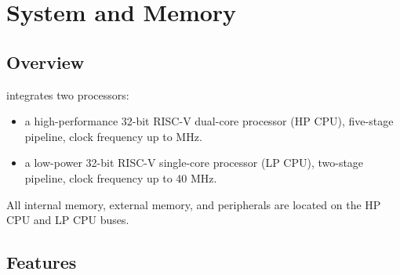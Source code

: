 \documentclass[main\_\_EN.tex]{subfiles}
\begin{document}

\ifglobal
\else
    {\let\clearpage\relax \listoftodos}
    {\let\clearpage\relax \listofdonetodos}
    \tableofcontents
\fi


\hypertarget{sysmem}{}
\chapter{System and Memory}
\label{mod:sysmem}

\section{Overview}
\chipname{} integrates two processors:
\begin{itemize}
    \item a high-performance 32-bit RISC-V dual-core processor (HP CPU), five-stage pipeline, clock frequency up to  MHz.
    \item a low-power 32-bit RISC-V single-core processor (LP CPU), two-stage pipeline, clock frequency up to 40 MHz.
\end{itemize}

All internal memory, external memory, and peripherals are located on the HP CPU and LP CPU buses.

\section{Features}
\end{document}
